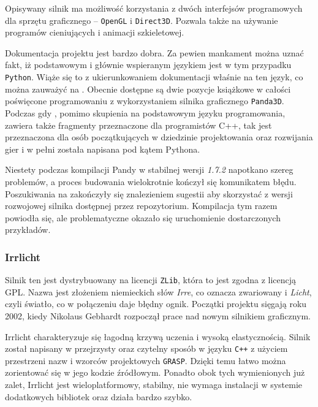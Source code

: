 \documentclass[11pt]{mwrep}
\begin{document}
      Opisywany silnik ma możliwość korzystania z dwóch interfejsów programowych dla sprzętu graficznego -- \texttt{OpenGL} i \texttt{Direct3D}. Pozwala także na używanie programów cieniujących i animacji szkieletowej.

      Dokumentacja projektu jest bardzo dobra. Za pewien mankament można uznać fakt, iż podstawowym i głównie wspieranym językiem jest w tym przypadku \texttt{Python}. Wiąże się to z ukierunkowaniem dokumentacji właśnie na ten język, co można zauważyć na \cite{panda}. Obecnie dostępne są dwie pozycje książkowe w całości poświęcone programowaniu z wykorzystaniem silnika graficznego \texttt{Panda3D}. Podczas gdy \cite{pandab1}, pomimo skupienia na podstawowym języku programowania, zawiera także fragmenty przeznaczone dla programistów C++, tak \cite{pandab2} jest przeznaczona dla osób początkujących w dziedzinie projektowania oraz rozwijania gier i w pełni została napisana pod kątem Pythona.

      Niestety podczas kompilacji Pandy w stabilnej wersji \textit{1.7.2} napotkano szereg problemów, a proces budowania wielokrotnie kończył się komunikatem błędu. Poszukiwania na \cite{pandaf} zakończyły się znalezieniem sugestii aby skorzystać z wersji rozwojowej silnika dostępnej przez repozytorium. Kompilacja tym razem powiodła się, ale problematyczne okazało się uruchomienie dostarczonych przykładów.

      \subsubsection{Irrlicht}

      Silnik ten jest dystrybuowany na licencji \texttt{ZLib}, która to jest zgodna z licencją GPL. Nazwa jest złożeniem niemieckich słów \textit{Irre}, co oznacza zwariowany i \textit{Licht}, czyli światło, co w połączeniu daje błędny ognik. Początki projektu sięgają roku 2002, kiedy Nikolaus Gebhardt rozpoczął prace nad nowym silnikiem graficznym.

      Irrlicht charakteryzuje się łagodną krzywą uczenia i wysoką elastycznością. Silnik został napisany w przejrzysty oraz czytelny sposób w języku \texttt{C++} z użyciem przestrzeni nazw i wzorców projektowych \texttt{GRASP}. Dzięki temu łatwo można zorientować się w jego kodzie źródłowym. Ponadto obok tych wymienionych już zalet, Irrlicht jest wieloplatformowy, stabilny, nie wymaga instalacji w systemie dodatkowych bibliotek oraz działa bardzo szybko. 
\end{document}
